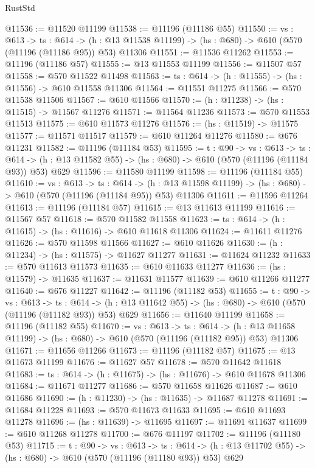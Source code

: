 \begin{lexlean}{RustStd}
\begin{coremodule}
@11536 := @11520 @11199
@11538 := @11196 (@11186 @55)
@11550 := {vs : @613} ->
  {ts : @614} ->
  (h : @13 @11538 @11199) -> (hs : @680) -> @610 (@570 (@11196 (@11186 @95)) @53) @11306
@11551 := @11536 @11262
@11553 := @11196 (@11186 @57)
@11555 := @13 @11553 @11199
@11556 := @11507 @57
@11558 := @570 @11522 @11498
@11563 := {ts : @614} -> (h : @11555) -> (hs : @11556) -> @610 @11558 @11306
@11564 := @11551 @11275
@11566 := @570 @11538 @11506
@11567 := @610 @11566
@11570 := (h : @11238) -> (hs : @11515) -> @11567 @11276
@11571 := @11564 @11236
@11573 := @570 @11553 @11513
@11575 := @610 @11573 @11276
@11576 := (hs : @11519) -> @11575
@11577 := @11571 @11517
@11579 := @610 @11264 @11276
@11580 := @676 @11231
@11582 := @11196 (@11184 @53)
@11595 := {t : @90} ->
  {vs : @613} ->
  {ts : @614} -> (h : @13 @11582 @55) -> (hs : @680) -> @610 (@570 (@11196 (@11184 @93)) @53) @629
@11596 := @11580 @11199
@11598 := @11196 (@11184 @55)
@11610 := {vs : @613} ->
  {ts : @614} ->
  (h : @13 @11598 @11199) -> (hs : @680) -> @610 (@570 (@11196 (@11184 @95)) @53) @11306
@11611 := @11596 @11264
@11613 := @11196 (@11184 @57)
@11615 := @13 @11613 @11199
@11616 := @11567 @57
@11618 := @570 @11582 @11558
@11623 := {ts : @614} -> (h : @11615) -> (hs : @11616) -> @610 @11618 @11306
@11624 := @11611 @11276
@11626 := @570 @11598 @11566
@11627 := @610 @11626
@11630 := (h : @11234) -> (hs : @11575) -> @11627 @11277
@11631 := @11624 @11232
@11633 := @570 @11613 @11573
@11635 := @610 @11633 @11277
@11636 := (hs : @11579) -> @11635
@11637 := @11631 @11577
@11639 := @610 @11266 @11277
@11640 := @676 @11227
@11642 := @11196 (@11182 @53)
@11655 := {t : @90} ->
  {vs : @613} ->
  {ts : @614} -> (h : @13 @11642 @55) -> (hs : @680) -> @610 (@570 (@11196 (@11182 @93)) @53) @629
@11656 := @11640 @11199
@11658 := @11196 (@11182 @55)
@11670 := {vs : @613} ->
  {ts : @614} ->
  (h : @13 @11658 @11199) -> (hs : @680) -> @610 (@570 (@11196 (@11182 @95)) @53) @11306
@11671 := @11656 @11266
@11673 := @11196 (@11182 @57)
@11675 := @13 @11673 @11199
@11676 := @11627 @57
@11678 := @570 @11642 @11618
@11683 := {ts : @614} -> (h : @11675) -> (hs : @11676) -> @610 @11678 @11306
@11684 := @11671 @11277
@11686 := @570 @11658 @11626
@11687 := @610 @11686
@11690 := (h : @11230) -> (hs : @11635) -> @11687 @11278
@11691 := @11684 @11228
@11693 := @570 @11673 @11633
@11695 := @610 @11693 @11278
@11696 := (hs : @11639) -> @11695
@11697 := @11691 @11637
@11699 := @610 @11268 @11278
@11700 := @676 @11197
@11702 := @11196 (@11180 @53)
@11715 := {t : @90} ->
  {vs : @613} ->
  {ts : @614} -> (h : @13 @11702 @55) -> (hs : @680) -> @610 (@570 (@11196 (@11180 @93)) @53) @629

\end{coremodule}
\end{lexlean}
